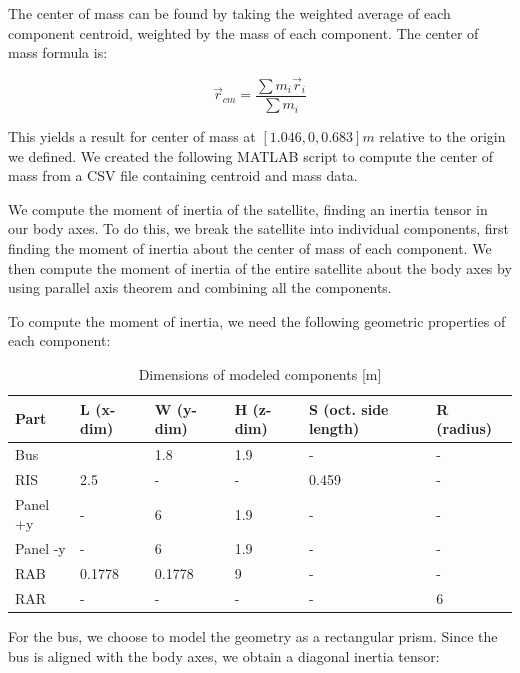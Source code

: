 The center of mass can be found by taking the weighted average of each component centroid, weighted by the mass of each component. The center of mass formula is:

\begin{equation*}
    \Vec{r}_{cm} = \frac{\sum m_{i} \Vec{r}_{i}}{\sum m_{i}}
\end{equation*}

This yields a result for center of mass at $[1.046, 0, 0.683] m$ relative to the origin we defined. We created the following MATLAB script to compute the center of mass from a CSV file containing centroid and mass data.



We compute the moment of inertia of the satellite, finding an inertia tensor in our body axes. To do this, we break the satellite into individual components, first finding the moment of inertia about the center of mass of each component. We then compute the moment of inertia of the entire satellite about the body axes by using parallel axis theorem and combining all the components.

To compute the moment of inertia, we need the following geometric properties of each component:

\begin{longtable}{l|l|l|l|l|l}
\caption{Dimensions of modeled components [m]}
\label{tab:dimensions}\\
\textbf{Part} & \textbf{L (x-dim)} & \textbf{W (y-dim)} & \textbf{H (z-dim)} & \textbf{S (oct. side length)} & \textbf{R (radius)} \\ \hline
\endfirsthead
%
\endhead
%
Bus &  & 1.8 & 1.9 & - & - \\
RIS & 2.5 & - & - & 0.459 & - \\
Panel +y & - & 6 & 1.9 & - & - \\
Panel -y & - & 6 & 1.9 & - & - \\
RAB & 0.1778 & 0.1778 & 9 & - & - \\
RAR & - & - & - & - & 6
\end{longtable}

For the bus, we choose to model the geometry as a rectangular prism. Since the bus is aligned with the body axes, we obtain a diagonal inertia tensor:

